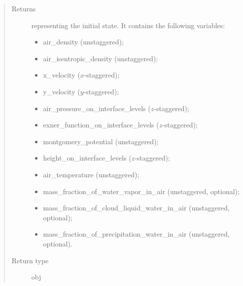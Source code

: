 \documentclass[letterpaper,10pt,english]{sphinxmanual}
\begin{document}
\begin{fulllineitems}
\begin{fulllineitems}
\begin{quote}
\begin{description}
\begin{itemize}
\end{itemize}

\item[{Returns}] \leavevmode

{\hyperref[\detokenize{api:tasmania.storages.state_isentropic.StateIsentropic}]{}} representing the initial state.
It contains the following variables:
\begin{itemize}
\item {} 
air\_density (unstaggered);

\item {} 
air\_isentropic\_density (unstaggered);

\item {} 
x\_velocity (\(x\)-staggered);

\item {} 
y\_velocity (\(y\)-staggered);

\item {} 
air\_pressure\_on\_interface\_levels (\(z\)-staggered);

\item {} 
exner\_function\_on\_interface\_levels (\(z\)-staggered);

\item {} 
montgomery\_potential (unstaggered);

\item {} 
height\_on\_interface\_levels (\(z\)-staggered);

\item {} 
air\_temperature (unstaggered);

\item {} 
mass\_fraction\_of\_water\_vapor\_in\_air (unstaggered, optional);

\item {} 
mass\_fraction\_of\_cloud\_liquid\_water\_in\_air (unstaggered, optional);

\item {} 
mass\_fraction\_of\_precipitation\_water\_in\_air (unstaggered, optional).

\end{itemize}


\item[{Return type}] \leavevmode
obj

\end{description}\end{quote}

\end{fulllineitems}



\end{fulllineitems}
\end{document}
